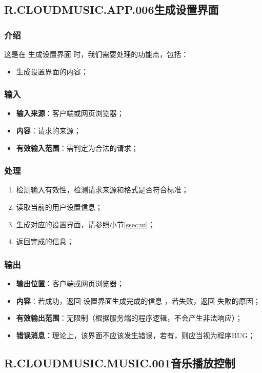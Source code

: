 \subsection{R.CLOUDMUSIC.APP.006生成设置界面}
\subsubsection{介绍}
	这是在 生成设置界面 时，我们需要处理的功能点，包括：
	\begin{itemize}
		\item 生成设置界面的内容；
	\end{itemize}
\subsubsection{输入}
	\begin{itemize}
		\item \textbf{输入来源}：客户端或网页浏览器；
		\item \textbf{内容}：请求的来源；
		\item \textbf{有效输入范围}：需判定为合法的请求；
	\end{itemize}
\subsubsection{处理}
	\begin{enumerate}
		\item 检测输入有效性，检测请求来源和格式是否符合标准；
		\item 读取当前的用户设置信息；
		\item 生成对应的设置界面，请参照小节\ref{ssec:ui}；
		\item 返回完成的信息；
	\end{enumerate}
\subsubsection{输出}
\begin{itemize}
	\item \textbf{输出位置}：客户端或网页浏览器；
	\item \textbf{内容}：若成功，返回 设置界面生成完成的信息 ，若失败，返回 失败的原因；
	\item \textbf{有效输出范围}：无限制（根据服务端的程序逻辑，不会产生非法响应）；
	\item \textbf{错误消息}：理论上，该界面不应该发生错误，若有，则应当视为程序BUG；
\end{itemize}

\subsection{R.CLOUDMUSIC.MUSIC.001音乐播放控制}
